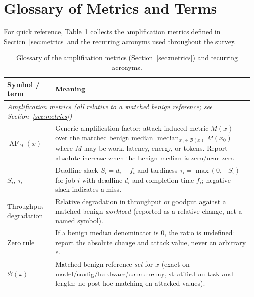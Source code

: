 \documentclass[acmsmall,screen,review,nonacm]{acmart}
\begin{document}



\clearpage
{}
\section{Glossary of Metrics and Terms}
\label{sec:glossary}

For quick reference, Table~\ref{tab:glossary} collects the amplification metrics defined in Section~\ref{sec:metrics} and the recurring acronyms used throughout the survey.

\begin{table}[htbp]
  \caption{Glossary of the amplification metrics (Section~\ref{sec:metrics}) and recurring acronyms.}
  \label{tab:glossary}
  \small
  \begin{tabularx}{\linewidth}{l X}
    \toprule
    \textbf{Symbol / term} & \textbf{Meaning} \\
    \midrule
    \multicolumn{2}{l}{\emph{Amplification metrics (all relative to a matched benign reference; see Section~\ref{sec:metrics})}} \\
    \addlinespace[2pt]
    $\operatorname{AF}_{M}(x)$ & Generic amplification factor: attack-induced metric $M(x)$ over the matched benign median $\operatorname{median}_{x_0\in\mathcal{B}(x)}M(x_0)$, where $M$ may be work, latency, energy, or tokens. Report absolute increase when the benign median is zero/near-zero. \\
    $S_i$, $\tau_i$ & Deadline slack $S_i=d_i-f_i$ and tardiness $\tau_i=\max(0,-S_i)$ for job $i$ with deadline $d_i$ and completion time $f_i$; negative slack indicates a miss. \\
    Throughput degradation & Relative degradation in throughput or goodput against a matched benign \emph{workload} (reported as a relative change, not a named symbol). \\
    Zero rule & If a benign median denominator is $0$, the ratio is undefined: report the absolute change and attack value, never an arbitrary $\epsilon$. \\
    $\mathcal{B}(x)$ & Matched benign reference \emph{set} for $x$ (exact on model/config/hardware/concurrency; stratified on task and length; no post hoc matching on attacked values). \\
    \addlinespace[3pt]
    \multicolumn{2}{l}{\emph{Acronyms}} \\

\end{tabularx}
\end{table}
\end{document}
